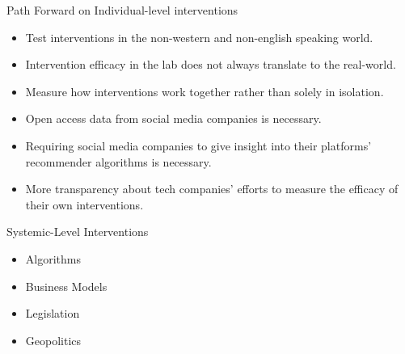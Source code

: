 \documentclass[nobackground,dvipsnames,table]{beamer}
\begin{document}
\begin{frame}{Path Forward on Individual-level interventions}

\begin{itemize}
    \item Test interventions in the non-western and non-english speaking world.
    \item Intervention efficacy in the lab does not always translate to the real-world.
    \item Measure how interventions work together rather than solely in isolation.
    \item Open access data from social media companies is necessary.
    \item Requiring social media companies to give insight into their platforms’ recommender algorithms is necessary.
    \item More transparency about tech companies’ efforts to measure the efficacy of their own interventions.
\end{itemize}
    
\end{frame}


\begin{frame}{Systemic-Level Interventions}

\begin{itemize}
    \item Algorithms
    \item Business Models
    \item Legislation
    \item Geopolitics
\end{itemize}
    
\end{frame}
\end{document}
